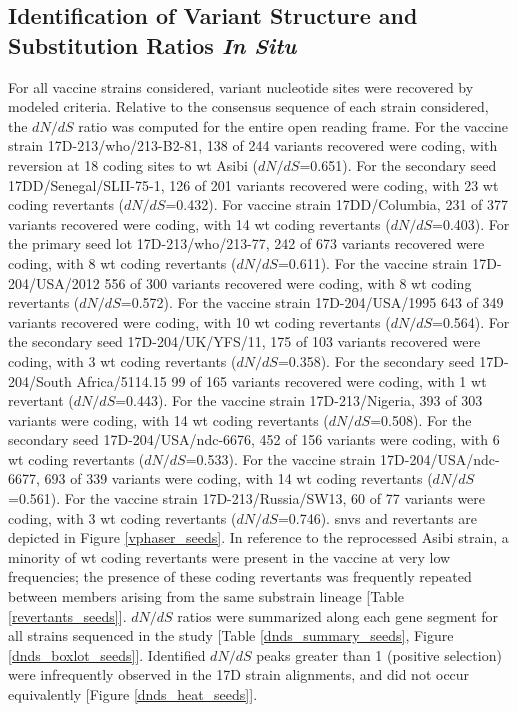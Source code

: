 	\subsection{Identification of Variant Structure and Substitution Ratios \emph{In Situ}}
For all vaccine strains considered, variant nucleotide sites were recovered by modeled criteria. Relative to the consensus sequence of each strain considered, the $dN/dS$ ratio was computed for the entire open reading frame. For the vaccine strain 17D-213/\gls{who}/213-B2-81, 138 of 244 variants recovered were coding, with reversion at 18 coding sites to \gls{wt} Asibi ($dN/dS$=0.651). For the secondary seed 17DD/Senegal/SLII-75-1, 126 of 201 variants recovered were coding, with 23 \gls{wt} coding revertants ($dN/dS$=0.432). For vaccine strain 17DD/Columbia, 231 of 377 variants recovered were coding, with 14 \gls{wt} coding revertants ($dN/dS$=0.403). For the primary seed lot 17D-213/\gls{who}/213-77, 242 of 673 variants recovered were coding, with 8 \gls{wt} coding revertants ($dN/dS$=0.611). For the vaccine strain 17D-204/USA/2012 556 of 300 variants recovered were coding, with 8 \gls{wt} coding revertants ($dN/dS$=0.572). For the vaccine strain 17D-204/USA/1995 643 of 349 variants recovered were coding, with 10 \gls{wt} coding revertants ($dN/dS$=0.564). For the secondary seed 17D-204/UK/YFS/11, 175 of 103 variants recovered were coding, with 3 \gls{wt} coding revertants ($dN/dS$=0.358). For the secondary seed 17D-204/South Africa/5114.15 99 of 165 variants recovered were coding, with 1 \gls{wt} revertant ($dN/dS$=0.443). For the vaccine strain 17D-213/Nigeria, 393 of 303 variants were coding, with 14 \gls{wt} coding revertants ($dN/dS$=0.508). For the secondary seed 17D-204/USA/\gls{ndc}-6676, 452 of 156 variants were coding, with 6 \gls{wt} coding revertants ($dN/dS$=0.533). For the vaccine strain 17D-204/USA/\gls{ndc}-6677, 693 of 339 variants were coding, with 14 \gls{wt} coding revertants ($dN/dS$=0.561). For the vaccine strain 17D-213/Russia/SW13, 60 of 77 variants were coding, with 3 \gls{wt} coding revertants ($dN/dS$=0.746). \Glspl{snv} and revertants are depicted in Figure \ref{vphaser_seeds}. In reference to the reprocessed Asibi strain, a minority of \gls{wt} coding revertants were present in the vaccine at very low frequencies; the presence of these coding revertants was frequently repeated between members arising from the same substrain lineage [Table \ref{revertants_seeds}]. $dN/dS$ ratios were summarized along each gene segment for all strains sequenced in the study [Table \ref{dnds_summary_seeds}, Figure \ref{dnds_boxlot_seeds}]. Identified $dN/dS$ peaks greater than 1 (positive selection) were infrequently observed in the 17D strain alignments, and did not occur equivalently [Figure \ref{dnds_heat_seeds}].
